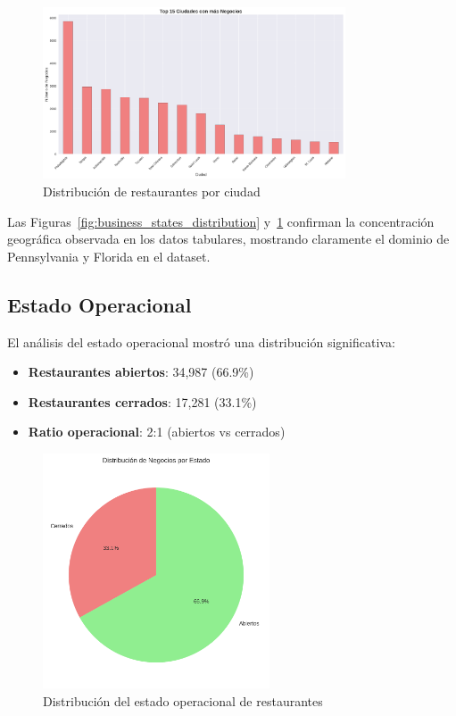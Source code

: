 \documentclass[12pt,a4paper,twoside,openany]{book}
\begin{document}
\begin{figure}[H]
\centering
\includegraphics[width=0.8\textwidth]{figures/business_cities_distribution.png}
\caption{Distribución de restaurantes por ciudad}
\label{fig:business_cities_distribution}
\end{figure}

Las Figuras~\ref{fig:business_states_distribution} y~\ref{fig:business_cities_distribution} confirman la concentración geográfica observada en los datos tabulares, mostrando claramente el dominio de Pennsylvania y Florida en el dataset.

\subsection{Estado Operacional}

El análisis del estado operacional mostró una distribución significativa:

\begin{itemize}
    \item \textbf{Restaurantes abiertos}: 34,987 (66.9\%)
    \item \textbf{Restaurantes cerrados}: 17,281 (33.1\%)
    \item \textbf{Ratio operacional}: 2:1 (abiertos vs cerrados)
\end{itemize}

\begin{figure}[H]
\centering
\includegraphics[width=0.6\textwidth]{figures/estado_negocios.png}
\caption{Distribución del estado operacional de restaurantes}
\label{fig:estado_negocios}
\end{figure}
\end{document}
